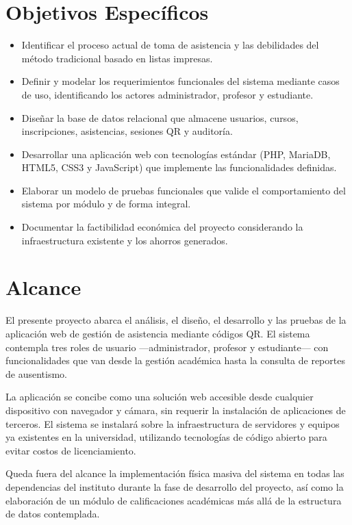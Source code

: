 \documentclass[12pt, letterpaper, oneside]{report}
\begin{document}
\section{Objetivos Espec\'ificos}

\begin{itemize}
  \item Identificar el proceso actual de toma de asistencia y las debilidades del m\'etodo tradicional basado en listas impresas.
  \item Definir y modelar los requerimientos funcionales del sistema mediante casos de uso, identificando los actores administrador, profesor y estudiante.
  \item Dise\~nar la base de datos relacional que almacene usuarios, cursos, inscripciones, asistencias, sesiones QR y auditor\'ia.
  \item Desarrollar una aplicaci\'on web con tecnolog\'ias est\'andar (PHP, MariaDB, HTML5, CSS3 y JavaScript) que implemente las funcionalidades definidas.
  \item Elaborar un modelo de pruebas funcionales que valide el comportamiento del sistema por m\'odulo y de forma integral.
  \item Documentar la factibilidad econ\'omica del proyecto considerando la infraestructura existente y los ahorros generados.
\end{itemize}

\section{Alcance}

El presente proyecto abarca el an\'alisis, el dise\~no, el desarrollo y las pruebas de la aplicaci\'on web de gesti\'on de asistencia mediante c\'odigos QR. El sistema contempla tres roles de usuario ---administrador, profesor y estudiante--- con funcionalidades que van desde la gesti\'on acad\'emica hasta la consulta de reportes de ausentismo.

La aplicaci\'on se concibe como una soluci\'on web accesible desde cualquier dispositivo con navegador y c\'amara, sin requerir la instalaci\'on de aplicaciones de terceros. El sistema se instalar\'a sobre la infraestructura de servidores y equipos ya existentes en la universidad, utilizando tecnolog\'ias de c\'odigo abierto para evitar costos de licenciamiento.

Queda fuera del alcance la implementaci\'on f\'isica masiva del sistema en todas las dependencias del instituto durante la fase de desarrollo del proyecto, as\'i como la elaboraci\'on de un m\'odulo de calificaciones acad\'emicas m\'as all\'a de la estructura de datos contemplada.
\end{document}
